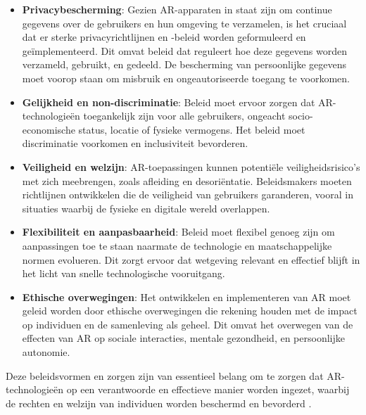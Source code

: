 \begin{itemize}
    \item \textbf{Privacybescherming}: Gezien AR-apparaten in staat zijn om continue gegevens over de gebruikers en hun omgeving te verzamelen, is het cruciaal dat er sterke privacyrichtlijnen en -beleid worden geformuleerd en geïmplementeerd. Dit omvat beleid dat reguleert hoe deze gegevens worden verzameld, gebruikt, en gedeeld. De bescherming van persoonlijke gegevens moet voorop staan om misbruik en ongeautoriseerde toegang te voorkomen.
    \item \textbf{Gelijkheid en non-discriminatie}: Beleid moet ervoor zorgen dat AR-technologieën toegankelijk zijn voor alle gebruikers, ongeacht socio-economische status, locatie of fysieke vermogens. Het beleid moet discriminatie voorkomen en inclusiviteit bevorderen.
    \item \textbf{Veiligheid en welzijn}: AR-toepassingen kunnen potentiële veiligheidsrisico's met zich meebrengen, zoals afleiding en desoriëntatie. Beleidsmakers moeten richtlijnen ontwikkelen die de veiligheid van gebruikers garanderen, vooral in situaties waarbij de fysieke en digitale wereld overlappen.
    \item \textbf{Flexibiliteit en aanpasbaarheid}: Beleid moet flexibel genoeg zijn om aanpassingen toe te staan naarmate de technologie en maatschappelijke normen evolueren. Dit zorgt ervoor dat wetgeving relevant en effectief blijft in het licht van snelle technologische vooruitgang.
    \item \textbf{Ethische overwegingen}: Het ontwikkelen en implementeren van AR moet geleid worden door ethische overwegingen die rekening houden met de impact op individuen en de samenleving als geheel. Dit omvat het overwegen van de effecten van AR op sociale interacties, mentale gezondheid, en persoonlijke autonomie.
\end{itemize}

Deze beleidsvormen en zorgen zijn van essentieel belang om te zorgen dat AR-technologieën op een verantwoorde en effectieve manier worden ingezet, waarbij de rechten en welzijn van individuen worden beschermd en bevorderd \autocite{Roesner2014}.




